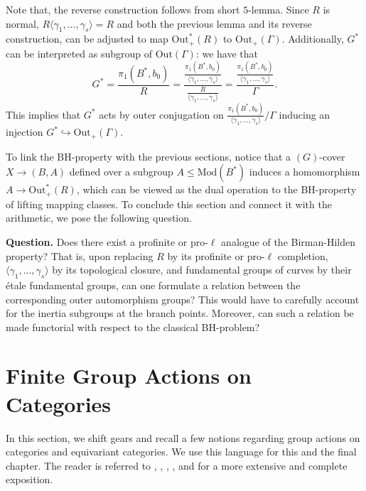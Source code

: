\documentclass[10pt]{amsart}
\theoremstyle{definition}
\begin{document}
Note that, the reverse construction follows from short $5$-lemma. Since $R$ is normal, $R\langle\gamma_1,\ldots,\gamma_s\rangle = R$ and both the previous lemma and its reverse construction, can be adjusted to map $\mathrm{Out}_+^*(R)$ to $\mathrm{Out}_+(\Gamma)$. 
Additionally, $G^*$ can be interpreted as subgroup of $\mathrm{Out}(\Gamma)$: we have that
\[
G^* = \frac{\pi_1(B^*,b_0)}{R}= 
\frac
{
  \frac{\pi_1(B^*,b_0)}{  \langle \gamma_1, \ldots, \gamma_s \rangle} 
}
{ 
  \frac{R}
{ \langle \gamma_1, \ldots, \gamma_s \rangle}
}
=
\frac{\frac{\pi_1(B^*,b_0)}{  \langle \gamma_1, \ldots, \gamma_s \rangle}}{\Gamma}.
\]
This implies that $G^*$ acts by outer conjugation on $\frac{\pi_1(B^*,b_0)}{  \langle \gamma_1, \ldots, \gamma_s \rangle}/\Gamma$ inducing an injection $G^*\hookrightarrow \mathrm{Out}_+(\Gamma)$.

To link the BH-property with the previous sections, notice that a $(G)$-cover $X\rightarrow (B,A)$ defined over a subgroup $A\leq \mathrm{Mod} (B^*)$ induces a homomorphism $A\rightarrow \mathrm{Out}_+^*(R)$, which can be viewed as the dual operation to the BH-property of lifting mapping classes. To conclude this section and connect it with the arithmetic, we pose the following question.

\textbf{Question.}
Does there exist a profinite or pro-$\ell$ analogue of the Birman-Hilden property? That is, upon replacing $R$ by its profinite or pro-$\ell$ completion, $\langle \gamma_1,\ldots,\gamma_s\rangle$ by its topological closure, and fundamental groups of curves by their étale fundamental groups, can one formulate a relation between the corresponding outer automorphism groups? This would have to carefully account for the inertia subgroups at the branch points.
Moreover, can such a relation be made functorial with respect to the classical BH-problem?



\section{Finite Group Actions on Categories}
\label{sec:equivCat}

In this section, we shift gears and recall a few notions regarding group actions on categories and equivariant categories. We use this language for this and the final chapter. The reader is referred to \cite{elagin2015equivarianttriangulatedcategories}, \cite{MR3979084}, \cite{MR2353249}, \cite{MR4589277}, \cite{MR3334458}  and \cite{karakikes2025equivariantrecollementssingularequivalences}
for a more extensive and complete exposition. 
\end{document}
